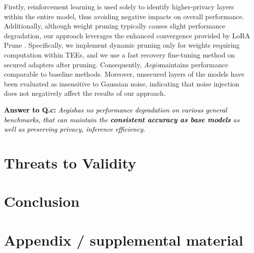 \documentclass{article}
\newcommand{\method}{\textit{Aegis}}
\begin{document}
Firstly, reinforcement learning is used solely to identify higher-privacy layers within the entire model, thus avoiding negative impacts on overall performance. Additionally, although weight pruning typically causes slight performance degradation, our approach leverages the enhanced convergence provided by LoRA Prune \cite{zhang2023loraprune}. Specifically, we implement dynamic pruning only for weights requiring computation within TEEs, and we use a fast recovery fine-tuning method on secured adapters after pruning. Consequently, \method maintains performance comparable to baseline methods. Moreover, unsecured layers of the models have been evaluated as insensitive to Gaussian noise, indicating that noise injection does not negatively affect the results of our approach. 
\begin{center}
    \begin{tcolorbox}[
            colframe=black,width=1\linewidth,
            arc=1mm, auto outer arc]
            \textcolor{black}{{\textbf{Answer to Q.c:} 
            \textit{\method has no performance degradation on various general benchmarks, that can maintain the \textbf{consistent accuracy as base models} as well as preserving privacy, inference efficiency.}}}
    \end{tcolorbox}
\end{center}

\section{Threats to Validity}

\section{Conclusion}

\newpage


\newpage

\appendix
\section{Appendix / supplemental material}

\end{document}
